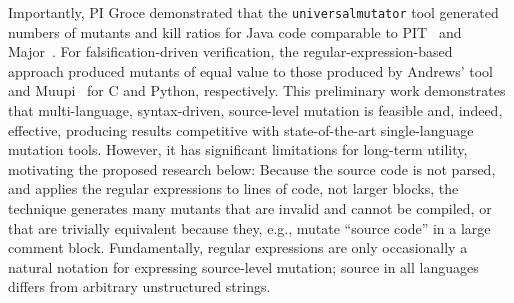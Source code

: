 Importantly,  PI Groce demonstrated that the {\tt universalmutator} tool generated
numbers of mutants and kill ratios for Java code comparable to
PIT~\cite{pittest} and Major~\cite{Major}.  For falsification-driven
verification, the regular-expression-based approach produced mutants of equal
value to those produced by Andrews' tool~\cite{mutant} and Muupi~\cite{muupi}
for C and Python, respectively.
%
%
%
This preliminary work demonstrates that multi-language, syntax-driven, source-level mutation is
feasible and, indeed, effective, producing results competitive with
state-of-the-art single-language mutation tools.
However, it has significant limitations for long-term utility, motivating the
proposed research below: Because the source
code is not parsed, and applies the regular expressions to lines of code, not
larger blocks, the technique generates many mutants that are invalid
and cannot be compiled, or that are trivially equivalent because they, e.g.,
mutate ``source code'' in a large comment block.
Fundamentally, regular expressions are
only occasionally a natural notation for expressing source-level mutation;
source in all languages differs from arbitrary unstructured strings.

